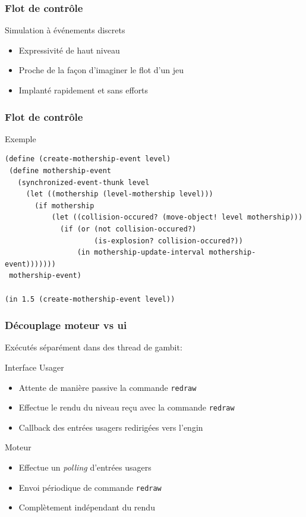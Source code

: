 \documentclass{beamer}
\newcommand{\<}[1]{\`#1}
\begin{document}
\begin{frame}
  \frametitle{Flot de contrôle}
  \begin{block}{Simulation à événements discrets}
    \begin{itemize}
    \item Expressivité de haut niveau
    \item Proche de la façon d'imaginer le flot d'un jeu
    \item Implanté rapidement et sans efforts
    \end{itemize}
  \end{block}
\end{frame}

\begin{frame}[fragile]
  \frametitle{Flot de contrôle}
  \begin{block}{Exemple}
    \begin{lstlisting}[basicstyle=\footnotesize]
(define (create-mothership-event level)
 (define mothership-event
   (synchronized-event-thunk level
     (let ((mothership (level-mothership level)))
       (if mothership
           (let ((collision-occured? (move-object! level mothership)))
             (if (or (not collision-occured?)
                     (is-explosion? collision-occured?))
                 (in mothership-update-interval mothership-event)))))))
 mothership-event)

(in 1.5 (create-mothership-event level))
    \end{lstlisting}
  \end{block}
\end{frame}

\begin{frame}
  \frametitle{Découplage moteur vs ui}

  Exécutés séparément dans des thread de gambit:
  \begin{block}{Interface Usager}
    \begin{itemize}
    \item Attente de manière passive la commande \texttt{redraw}
    \item Effectue le rendu du niveau reçu avec la commande
      \texttt{redraw}
    \item Callback des entrées usagers redirigées vers l'engin
    \end{itemize}
  \end{block}

  \begin{block}{Moteur}
    \begin{itemize}
    \item Effectue un \textit{polling} d'entrées usagers
    \item Envoi périodique de commande \texttt{redraw}
    \item Complètement indépendant du rendu
    \end{itemize}
  \end{block}
\end{frame}
\end{document}
